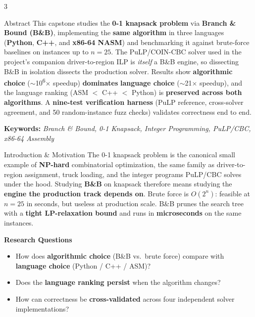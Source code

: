 \documentclass[a0,portrait]{a0poster}
\newcommand{\kw}[1]{\textcolor{BCDarkBlue}{\textbf{#1}}}
\newcommand{\KW}[1]{\textcolor{BCRed}{\textbf{#1}}}
\begin{document}
\begin{multicols}{3}

\begin{posterblock}{Abstract}
This capstone studies the \kw{0-1 knapsack problem} via \KW{Branch \& Bound (B\&B)}, implementing the \kw{same algorithm} in three languages (\kw{Python}, \kw{C++}, and \kw{x86-64 NASM}) and benchmarking it against brute-force baselines on instances up to $n = 25$. The PuLP/COIN-CBC solver used in the project's companion driver-to-region ILP is \emph{itself} a B\&B engine, so dissecting B\&B in isolation dissects the production solver. Results show \KW{algorithmic choice} ($\sim$10\textsuperscript{6}$\times$ speedup) \kw{dominates} \KW{language choice} ($\sim$21$\times$ speedup), and the language ranking (ASM $<$ C++ $<$ Python) is \kw{preserved across both algorithms}. A \kw{nine-test verification harness} (PuLP reference, cross-solver agreement, and 50 random-instance fuzz checks) validates correctness end to end.

\vspace{0.5em}
\textbf{Keywords:} \textit{Branch \& Bound, 0-1 Knapsack, Integer Programming, PuLP/CBC, x86-64 Assembly}
\end{posterblock}

\begin{posterblock}{Introduction \& Motivation}
The 0-1 knapsack problem is the canonical small example of \KW{NP-hard} combinatorial optimization, the same family as driver-to-region assignment, truck loading, and the integer programs PuLP/CBC solves under the hood. Studying \kw{B\&B} on knapsack therefore means studying the \kw{engine the production track depends on}. Brute force is \KW{$O(2^n)$}: feasible at $n=25$ in seconds, but useless at production scale. B\&B prunes the search tree with a \kw{tight LP-relaxation bound} and runs in \KW{microseconds} on the same instances.

\vspace{0.5em}
\textbf{Research Questions}
\begin{itemize}[leftmargin=1.4em,itemsep=4pt,topsep=4pt]
  \item How does \kw{algorithmic choice} (B\&B vs.\ brute force) compare with \kw{language choice} (Python / C++ / ASM)?
  \item Does the \kw{language ranking persist} when the algorithm changes?
  \item How can correctness be \kw{cross-validated} across four independent solver implementations?
\end{itemize}


\end{posterblock}
\end{multicols}
\end{document}
